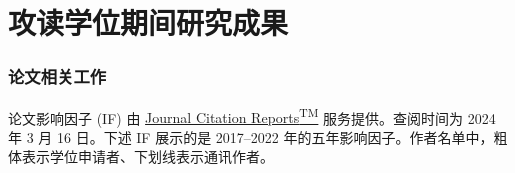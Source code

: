 
\chapter{攻读学位期间研究成果}


\subsection*{论文相关工作}

论文影响因子 (IF) 由 \href{https://jcr.clarivate.com/jcr/browse-journals}{Journal Citation Reports\textsuperscript{TM}} 服务提供。查阅时间为 2024 年 3 月 16 日。下述 IF 展示的是 2017--2022 年的五年影响因子。作者名单中，粗体表示学位申请者、下划线表示通讯作者。

